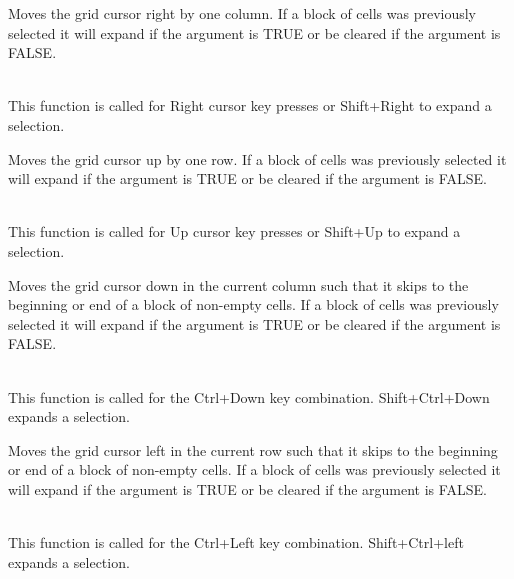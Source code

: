 Moves the grid cursor right by one column. If a block of cells was previously selected it
will expand if the argument is TRUE or be cleared if the argument is FALSE.

\\
This function is called for Right cursor key presses or Shift+Right to expand a selection.

\label{wxgridmovecursorup}


Moves the grid cursor up by one row. If a block of cells was previously selected it
will expand if the argument is TRUE or be cleared if the argument is FALSE.

\\
This function is called for Up cursor key presses or Shift+Up to expand a selection.

\label{wxgridmovecursordownblock}


Moves the grid cursor down in the current column such that it skips to the beginning or
end of a block of non-empty cells. If a block of cells was previously selected it
will expand if the argument is TRUE or be cleared if the argument is FALSE.

\\
This function is called for the Ctrl+Down key combination. Shift+Ctrl+Down expands a selection.

\label{wxgridmovecursorleftblock}


Moves the grid cursor left in the current row such that it skips to the beginning or
end of a block of non-empty cells. If a block of cells was previously selected it
will expand if the argument is TRUE or be cleared if the argument is FALSE.

\\
This function is called for the Ctrl+Left key combination. Shift+Ctrl+left expands a selection.

\label{wxgridmovecursorrightblock}



